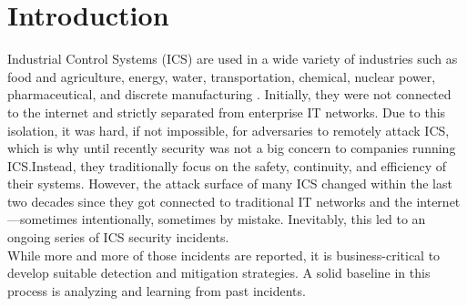 \documentclass[runningheads]{llncs}
\begin{document}
\section{Introduction}
Industrial Control Systems (ICS) are used in a wide variety of industries such as food and agriculture, energy, water, transportation, chemical, nuclear power, pharmaceutical, and discrete manufacturing \cite{stouffer.2011}.
Initially, they were not connected to the internet and strictly separated from enterprise IT networks.
Due to this isolation, it was hard, if not impossible, for adversaries to remotely attack ICS, which is why until recently security was not a big concern to companies running ICS.Instead, they traditionally focus on the safety, continuity, and efficiency of their systems.
However, the attack surface of many ICS changed within the last two decades since they got connected to traditional IT networks and the internet---sometimes intentionally, sometimes by mistake.
Inevitably, this led to an ongoing series of ICS security incidents.\\
While more and more of those incidents are reported, it is business-critical to develop suitable detection and mitigation strategies.
A solid baseline in this process is analyzing and learning from past incidents.
\end{document}
